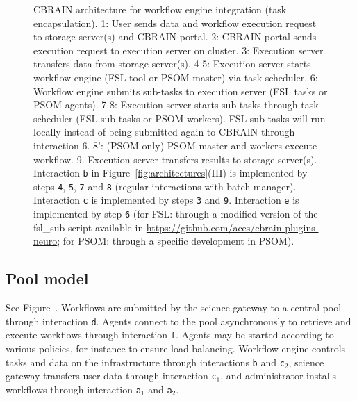 \documentclass[preprint,3p,twocolumn]{elsarticle}
\begin{document}
\begin{figure}
\centering
{} \hfill {}
\caption{CBRAIN architecture for workflow engine integration
  (task encapsulation).  1: User sends data and workflow execution request to
  storage server(s) and CBRAIN portal. 2: CBRAIN portal sends
  execution request to execution server on cluster. 3: Execution
  server transfers data from storage server(s). 4-5: Execution server
  starts workflow engine (FSL tool or PSOM master) via task
  scheduler. 6: Workflow engine submits sub-tasks to execution server
  (FSL tasks or PSOM agents). 7-8: Execution server starts sub-tasks
  through task scheduler (FSL sub-tasks or PSOM workers). FSL sub-tasks will run locally
  instead of being submitted again to CBRAIN through interaction 6. 8':
  (PSOM only) PSOM master and workers execute workflow. 9. Execution
  server transfers results to storage server(s). Interaction
  \texttt{b} in Figure~\ref{fig:architectures}(III) is implemented by steps
  \texttt{4}, \texttt{5}, \texttt{7} and \texttt{8} (regular
  interactions with batch manager). Interaction \texttt{c} is
  implemented by steps \texttt{3} and \texttt{9}. Interaction
  \texttt{e} is implemented by step \texttt{6} (for FSL: through a
  modified version of the fsl\_sub script available in
  \url{https://github.com/aces/cbrain-plugins-neuro}; for PSOM:
  through a specific development in PSOM).}
\label{fig:cbrain-sub-tasking}
\end{figure}

\subsection{Pool model}
\label{sec:pool}
See Figure~. Workflows are submitted by the
science gateway to a central pool through interaction
\texttt{d}. Agents connect to the pool asynchronously to retrieve and
execute workflows through interaction \texttt{f}. Agents may be
started according to various policies, for instance to ensure load
balancing. Workflow engine controls tasks and data on the
infrastructure through interactions \texttt{b} and \texttt{c$_2$},
science gateway transfers user data through interaction
\texttt{c$_1$}, and administrator installs workflows through
interaction \texttt{a$_1$} and \texttt{a$_2$}.
\end{document}

